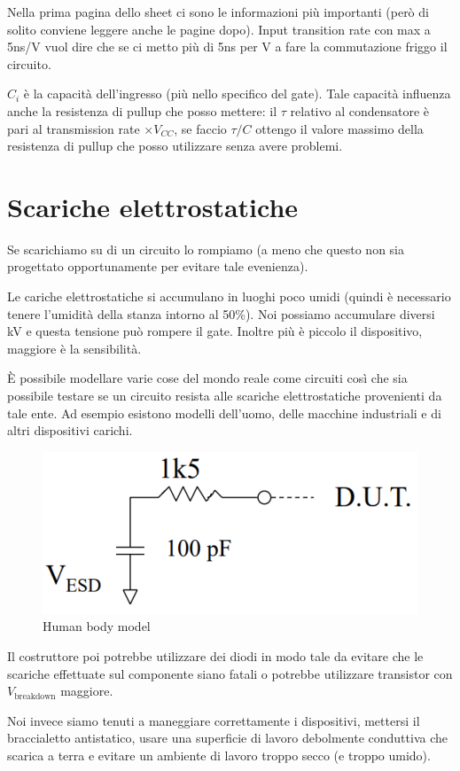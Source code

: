 \documentclass[
]{book}
\begin{document}
Nella prima pagina dello sheet ci sono le informazioni più importanti
(però di solito conviene leggere anche le pagine dopo). Input transition
rate con max a 5ns/V vuol dire che se ci metto più di 5ns per V a fare
la commutazione friggo il circuito.

\(C_{i}\) è la capacità dell'ingresso (più nello specifico del gate).
Tale capacità influenza anche la resistenza di pullup che posso mettere:
il \(\tau\) relativo al condensatore è pari al transmission rate
\(\times V_{CC}\), se faccio \(\tau/C\) ottengo il valore massimo della
resistenza di pullup che posso utilizzare senza avere problemi.

\section{Scariche elettrostatiche}\label{scariche-elettrostatiche}

Se scarichiamo su di un circuito lo rompiamo (a meno che questo non sia
progettato opportunamente per evitare tale evenienza).

Le cariche elettrostatiche si accumulano in luoghi poco umidi (quindi è
necessario tenere l'umidità della stanza intorno al 50\%). Noi possiamo
accumulare diversi kV e questa tensione può rompere il gate. Inoltre più
è piccolo il dispositivo, maggiore è la sensibilità.

È possibile modellare varie cose del mondo reale come circuiti così che
sia possibile testare se un circuito resista alle scariche
elettrostatiche provenienti da tale ente. Ad esempio esistono modelli
dell'uomo, delle macchine industriali e di altri dispositivi carichi.

\begin{figure}
\centering
\includegraphics[width=0.3\linewidth,height=\textheight,keepaspectratio]{immagini/40.png}
\caption{Human body model}
\end{figure}

Il costruttore poi potrebbe utilizzare dei diodi in modo tale da evitare
che le scariche effettuate sul componente siano fatali o potrebbe
utilizzare transistor con \(V_{\text{breakdown}}\) maggiore.

Noi invece siamo tenuti a maneggiare correttamente i dispositivi,
mettersi il braccialetto antistatico, usare una superficie di lavoro
debolmente conduttiva che scarica a terra e evitare un ambiente di
lavoro troppo secco (e troppo umido).
\end{document}
